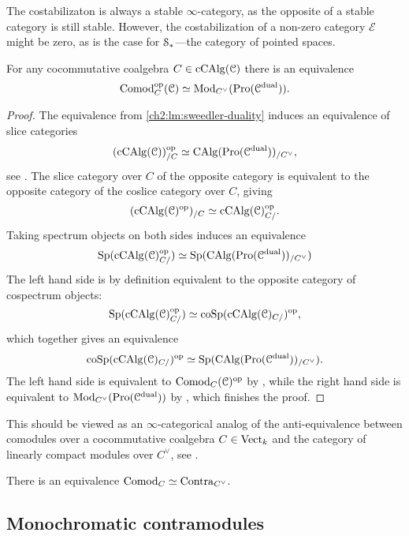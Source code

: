 The costabilizaton is always a stable $\infty$-category, as the opposite of a stable category is still stable. However, the costabilization of a non-zero category $\mathcal{E}$ might be zero, as is the case for $\EuScript{S}_*$---the category of pointed spaces. 

\begin{proposition}
    \label{ch2:prop:comodules-and-promodules}
    For any cocommutative coalgebra $C\in \operatorname{cCAlg}(\EuScript{C})$ there is an equivalence 
    \[\mathrm{Comod}^{\mathrm{op}}_C(\EuScript{C})\simeq \mathrm{Mod}_{C^\vee}(\operatorname{Pro}(\EuScript{C}^{\mathrm{dual}})).\]  
\end{proposition}
\begin{proof}
    The equivalence from \cref{ch2:lm:sweedler-duality} induces an equivalence of slice categories 
    \[(\operatorname{cCAlg}(\EuScript{C}))_{/C}^{\mathrm{op}} \simeq \operatorname{CAlg}(\operatorname{Pro}(\EuScript{C}^{\mathrm{dual}}))_{/C^\vee},\]
    see \cite[5.2.5.1]{lurie_09}. The slice category over $C$ of the opposite category is equivalent to the opposite category of the coslice category over $C$, giving 
    \[(\operatorname{cCAlg}(\EuScript{C})^{\mathrm{op}})_{/C} \simeq \operatorname{cCAlg}(\EuScript{C})^{\mathrm{op}}_{C/}.\]
    Taking spectrum objects on both sides induces an equivalence
    \[\mathrm{Sp}(\operatorname{cCAlg}(\EuScript{C})_{C/}^{\mathrm{op}})\simeq \mathrm{Sp}(\operatorname{CAlg}(\operatorname{Pro}(\EuScript{C}^{\mathrm{dual}}))_{/C^\vee})\]
    The left hand side is by definition equivalent to the opposite category of cospectrum objects:
    \[\mathrm{Sp}(\operatorname{cCAlg}(\EuScript{C})_{C/}^{\mathrm{op}})\simeq \mathrm{coSp}(\operatorname{cCAlg}(\EuScript{C})_{C/})^{\mathrm{op}},\]
    which together gives an equivalence
    \[\mathrm{coSp}(\operatorname{cCAlg}(\EuScript{C})_{C/})^{\mathrm{op}} \simeq \mathrm{Sp}(\operatorname{CAlg}(\operatorname{Pro}(\EuScript{C}^{\mathrm{dual}}))_{/C^\vee}).\]
    The left hand side is equivalent to $\mathrm{Comod}_C(\EuScript{C})^{\mathrm{op}}$ by \cite[1.0.3]{chen_2024}, while the right hand side is equivalent to $\mathrm{Mod}_{C^\vee}(\operatorname{Pro}(\EuScript{C}^{\mathrm{dual}}))$ by \cite[7.3.4.13]{Lurie_HA}, which finishes the proof.  
\end{proof}

\begin{remark}
    This should be viewed as an $\infty$-categorical analog of the anti-equivalence between comodules over a cocommutative coalgebra $C\in \mathrm{Vect}_k$ and the category of linearly compact modules over $C^\vee$, see \cite[II.29]{lefschetz_1942}. 
\end{remark}

\begin{corollary}
    There is an equivalence $\mathrm{Comod}_C \simeq \mathrm{Contra}_{C^\vee}$. 
\end{corollary}


\subsection{Monochromatic contramodules}

